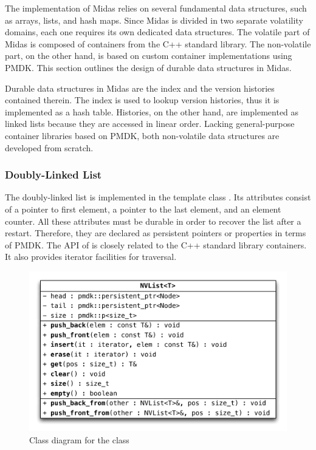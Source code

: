 The implementation of Midas relies on several fundamental data structures, such
as arrays, lists, and hash maps. Since Midas is divided in two separate
volatility domains, each one requires its own dedicated data structures. The
volatile part of Midas is composed of containers from the C++ standard library.
The non-volatile part, on the other hand, is based on custom container
implementations using PMDK. This section outlines the design of durable data
structures in Midas.


Durable data structures in Midas are the index and the version histories
contained therein. The index is used to lookup version histories, thus it is
implemented as a hash table. Histories, on the other hand, are implemented as
linked lists because they are accessed in linear order. Lacking general-purpose
container libraries based on PMDK, both non-volatile data structures are
developed from scratch.

\subsubsection{Doubly-Linked List}

The doubly-linked list is implemented in the template class . Its
attributes consist of a pointer to first element, a pointer to the last element,
and an element counter. All these attributes must be durable in order to recover
the list after a restart. Therefore, they are declared as persistent pointers or
properties in terms of PMDK. The API of  is closely related to the
C++ standard library containers. It also provides iterator facilities for
traversal.

\begin{figure}[h!]
    \centering
    \includegraphics[scale=0.66]{figures/impl/list.pdf}
    \caption{Class diagram for the class }
    \label{fig:impl-list}
\end{figure}

